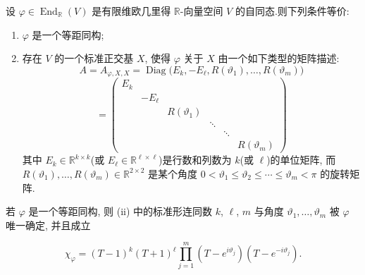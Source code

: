 \begin{theorem}\label{thm:7.5.8}
设 $\varphi \in \operatorname{End}_{\mathbb{R}}(V)$ 是有限维欧几里得 $\mathbb{R}$-向量空间 $V$ 的自同态.则下列条件等价:
\begin{enumerate}
\item[(i)] $\varphi$ 是一个等距同构;
\item[(ii)] 存在 $V$ 的一个标准正交基 $X$, 使得 $\varphi$ 关于 $X$ 由一个如下类型的矩阵描述:
\[
A = A_{\varphi, X, X} = \operatorname{Diag}\bigl(E_k, -E_\ell, R(\vartheta_1), \ldots, R(\vartheta_m)\bigr)
\]
\[
= \begin{pmatrix}
E_k & & & & & \\
& -E_\ell & & & & \\
& & R(\vartheta_1) & & & \\
& & & \ddots & & \\
& & & & \ddots & \\
& & & & & R(\vartheta_m)
\end{pmatrix}
\]
其中 $E_k \in \mathbb{R}^{k \times k}$(或 $E_\ell \in \mathbb{R}^{\ell \times \ell}$)是行数和列数为 $k$(或 $\ell$)的单位矩阵, 而 $R(\vartheta_1), \ldots, R(\vartheta_m) \in \mathbb{R}^{2 \times 2}$ 是某个角度 $0 < \vartheta_1 \leq \vartheta_2 \leq \cdots \leq \vartheta_m < \pi$ 的旋转矩阵.
\end{enumerate}

若 $\varphi$ 是一个等距同构, 则 (ii) 中的标准形连同数 $k$, $\ell$, $m$ 与角度 $\vartheta_1, \ldots, \vartheta_m$ 被 $\varphi$ 唯一确定, 并且成立

\[
\chi_\varphi = (T - 1)^k (T + 1)^\ell \prod_{j = 1}^{m} (T - e^{i\vartheta_j})(T - e^{-i\vartheta_j})\text{.}
\]
\end{theorem}

